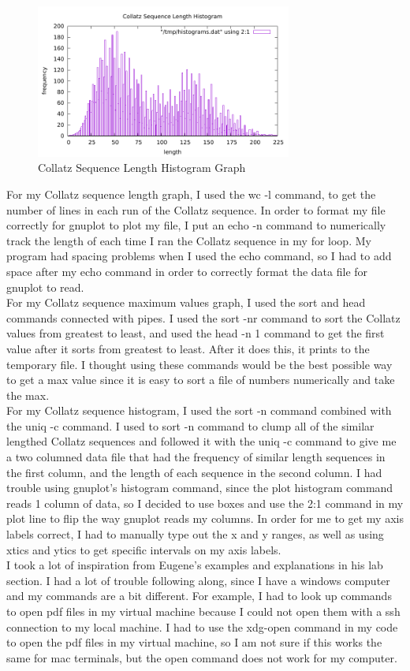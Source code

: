 \documentclass[11pt]{article}
\begin{document}
\begin{figure}[h]
\begin{centering}
\includegraphics[width=0.75\textwidth]{fig/histogram.pdf}
\caption{Collatz Sequence Length Histogram Graph}\label{fig:3}
\end{centering}
\end{figure}

For my Collatz sequence length graph, I used the wc -l command, to get the number of lines in each run of the Collatz sequence. In order to format my file correctly for gnuplot to plot my file, I put an echo -n command to numerically track the length of each time I ran the Collatz sequence in my for loop. My program had spacing problems when I used the echo command, so I had to add space after my echo command in order to correctly format the data file for gnuplot to read.\\
For my Collatz sequence maximum values graph, I used the sort and head commands connected with pipes. I used the sort -nr command to sort the Collatz values from greatest to least, and used the head -n 1 command to get the first value after it sorts from greatest to least. After it does this, it prints to the temporary file. I thought using these commands would be the best possible way to get a max value since it is easy to sort a file of numbers numerically and take the max.\\
For my Collatz sequence histogram, I used the sort -n command combined with the uniq -c command. I used to sort -n command to clump all of the similar lengthed Collatz sequences and followed it with the uniq -c command to give me a two columned data file that had the frequency of similar length sequences in the first column, and the length of each sequence in the second column. I had trouble using gnuplot's histogram command, since the plot histogram command reads 1 column of data, so I decided to use boxes and use the 2:1 command in my plot line to flip the way gnuplot reads my columns. In order for me to get my axis labels correct, I had to manually type out the x and y ranges, as well as using xtics and ytics to get specific intervals on my axis labels.\\
I took a lot of inspiration from Eugene's examples and explanations in his lab section. I had a lot of trouble following along, since I have a windows computer and my commands are a bit different. For example, I had to look up commands to open pdf files in my virtual machine because I could not open them with a ssh connection to my local machine. I had to use the xdg-open command in my code to open the pdf files in my virtual machine, so I am not sure if this works the same for mac terminals, but the open command does not work for my computer.
\end{document}
